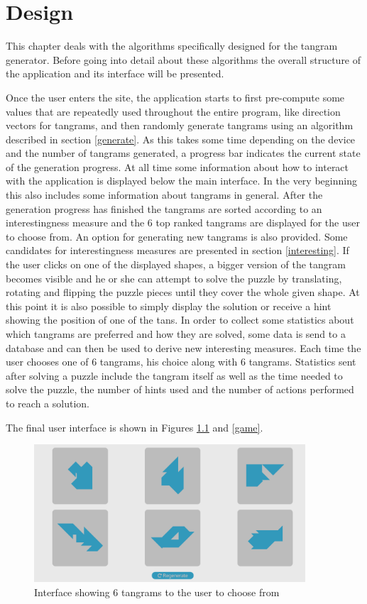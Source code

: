 \chapter{Design}\label{chapter:design}
This chapter deals with the algorithms specifically designed for the tangram generator. Before going into detail about these algorithms the overall structure of the application and its interface will be presented. 

Once the user enters the site, the application starts to first pre-compute some values that are repeatedly used throughout the entire program, like direction vectors for tangrams, and then randomly generate tangrams using an algorithm described in section \ref{generate}. As this takes some time depending on the device and the number of tangrams generated, a progress bar indicates the current state of the generation progress. At all time some information about how to interact with the application is displayed below the main interface. In the very beginning this also includes some information about tangrams in general. After the generation progress has finished the tangrams are sorted according to an interestingness measure and the 6 top ranked tangrams are displayed for the user to choose from. An option for generating new tangrams is also provided. Some candidates for interestingness measures are presented in section \ref{interesting}. If the user clicks on one of the displayed shapes, a bigger version of the tangram becomes visible and he or she can attempt to solve the puzzle by translating, rotating and flipping the puzzle pieces until they cover the whole given shape. At this point it is also possible to simply display the solution or receive a hint showing the position of one of the tans. 
In order to collect some statistics about which tangrams are preferred and how they are solved, some data is send to a database and can then be used to derive new interesting measures. Each time the user chooses one of 6 tangrams, his choice along with 6 tangrams. Statistics sent after solving a puzzle include the tangram itself as well as the time needed to solve the puzzle, the number of hints used and the number of actions performed to reach a solution.

The final user interface is shown in Figures \ref{choose} and \ref{game}.

\begin{figure}
\centering
    \includegraphics[width=0.9\textwidth]{figures/chose.png}
\caption{Interface showing 6 tangrams to the user to choose from}
\label{choose}
\end{figure}

